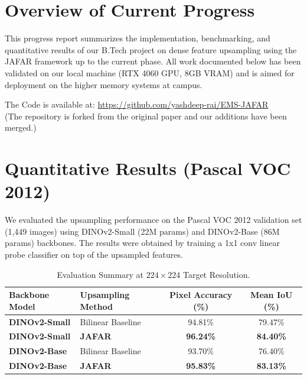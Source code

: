 \documentclass[12pt,a4paper]{article}
\begin{document}
\newpage

\section{Overview of Current Progress}
This progress report summarizes the implementation, benchmarking, and quantitative results of our B.Tech project on dense feature upsampling using the JAFAR framework up to the current phase. All work documented below has been validated on our local machine (RTX 4060 GPU, 8GB VRAM) and is aimed for deployment on the higher memory systems at campus.

\vspace{0.1in}
\noindent The Code is available at: \url{https://github.com/yashdeep-rai/EMS-JAFAR} \\
\noindent (The repository is forked from the original paper and our additions have been merged.)



\section{Quantitative Results (Pascal VOC 2012)}
We evaluated the upsampling performance on the Pascal VOC 2012 validation set (1,449 images) using DINOv2-Small (22M params) and DINOv2-Base (86M params) backbones. The results were obtained by training a 1x1 conv linear probe classifier on top of the upsampled features.

\begin{table}[H]
    \centering
    \caption{Evaluation Summary at $224 \times 224$ Target Resolution.}
    \label{tab:results}
    \begin{tabular}{llcc}
        \toprule
        Backbone Model & Upsampling Method & Pixel Accuracy (\%) & Mean IoU (\%) \\
        \midrule
        \textbf{DINOv2-Small} & Bilinear Baseline & 94.81\% & 79.47\% \\
        \textbf{DINOv2-Small} & \textbf{JAFAR} & \textbf{96.24\%} & \textbf{84.40\%} \\
        \midrule
        \textbf{DINOv2-Base}  & Bilinear Baseline & 93.70\% & 76.40\% \\
        \textbf{DINOv2-Base}  & \textbf{JAFAR} & \textbf{95.83\%} & \textbf{83.13\%} \\
        \bottomrule
    \end{tabular}
\end{table}
\end{document}
